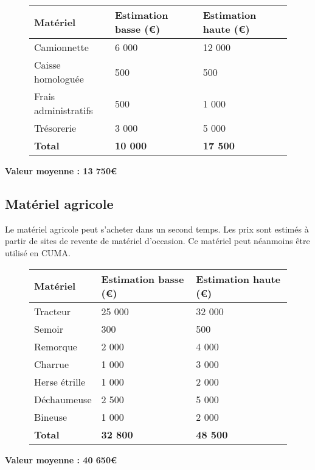 \documentclass{article}
\begin{document}
\begin{figure}[h!]
\begin{center}
\begin{tabular}{|p{4cm}|p{3.5cm}|p{3.5cm}|}
\hline
 Matériel & Estimation basse (\euro{}) & Estimation haute (\euro{})\\
\hline
Camionnette & \hfill 6 000 & \hfill 12 000 \\
Caisse homologuée & \hfill 500 & \hfill 500 \\
Frais administratifs & \hfill 500 & \hfill 1 000 \\
Trésorerie & \hfill 3 000 & \hfill 5 000 \\
\hline
\textbf{Total} & \hfill \textbf{10 000} & \hfill \textbf{17 500}
\\
\hline
\end{tabular}
\end{center}
\label{sejour_semaine}
\end{figure}

\textbf{Valeur moyenne : 13 750\euro{}}

\subsection{Matériel agricole}

Le matériel agricole peut s'acheter dans un second temps. Les prix sont estimés à partir de sites de revente de matériel d'occasion. Ce matériel peut néanmoins être utilisé en CUMA.

\begin{figure}[h!]
\begin{center}
\begin{tabular}{|p{4cm}|p{3.5cm}|p{3.5cm}|}
\hline
 Matériel & Estimation basse (\euro{}) & Estimation haute (\euro{})\\
\hline
Tracteur &\hfill 25 000 & \hfill 32 000 \\
Semoir &  \hfill 300 &  \hfill 500 \\
Remorque & \hfill 2 000 & \hfill 4 000 \\
Charrue & \hfill 1 000 & \hfill 3 000 \\
Herse étrille & \hfill 1 000 & \hfill 2 000 \\
Déchaumeuse & \hfill 2 500 & \hfill 5 000 \\
Bineuse & \hfill 1 000 & \hfill 2 000 \\
\hline
\textbf{Total} & \hfill \textbf{32 800} & \hfill \textbf{48 500}
\\
\hline
\end{tabular}
\end{center}
\label{sejour_semaine}
\end{figure}

\textbf{Valeur moyenne : 40 650\euro{}}
\end{document}
